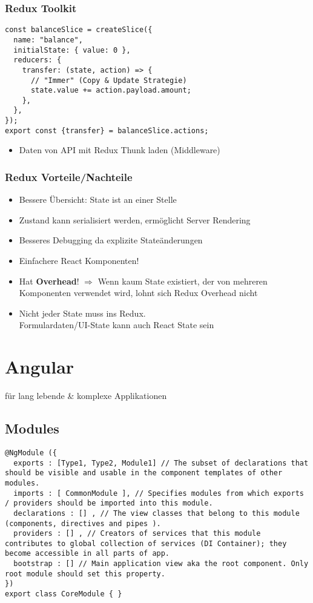 \begin{multicols*}{2}
\subsubsection{Redux Toolkit}
\begin{verbatim}
const balanceSlice = createSlice({
  name: "balance",
  initialState: { value: 0 },
  reducers: {
    transfer: (state, action) => {
      // "Immer" (Copy & Update Strategie)
      state.value += action.payload.amount;
    },
  },
});
export const {transfer} = balanceSlice.actions;
\end{verbatim}

\begin{itemize}
    \item Daten von API mit Redux Thunk laden (Middleware)
\end{itemize}

\subsubsection{Redux Vorteile/Nachteile}
\begin{itemize}
    \item Bessere Übersicht: State ist an einer Stelle
    \item Zustand kann serialisiert werden, ermöglicht Server Rendering
    \item Besseres Debugging da explizite Stateänderungen
    \item Einfachere React Komponenten!
    \item Hat \textbf{Overhead}! \(\Rightarrow\) Wenn kaum State existiert, der von mehreren Komponenten verwendet wird, lohnt sich Redux Overhead nicht
    \item Nicht jeder State muss ins Redux.\\Formulardaten/UI-State kann auch React State sein
\end{itemize}

\section{Angular}
für lang lebende \& komplexe Applikationen

\subsection{Modules}
\begin{verbatim}
@NgModule ({
  exports : [Type1, Type2, Module1] // The subset of declarations that should be visible and usable in the component templates of other modules.
  imports : [ CommonModule ], // Specifies modules from which exports / providers should be imported into this module.
  declarations : [] , // The view classes that belong to this module (components, directives and pipes ).
  providers : [] , // Creators of services that this module contributes to global collection of services (DI Container); they become accessible in all parts of app.
  bootstrap : [] // Main application view aka the root component. Only root module should set this property.
})
export class CoreModule { }
\end{verbatim}


\end{multicols*}
